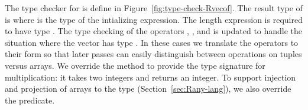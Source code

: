 \documentclass[11pt]{book}
\begin{document}
The type checker for \LangArray{} is define in
Figure~\ref{fig:type-check-Rvecof}. The result type of
 is  where  is the type
of the intializing expression.  The length expression is required to
have type . The type checking of the operators
, , and   is
updated to handle the situation where the vector has type
. In these cases we translate the operators to their
 form so that later passes can easily distinguish
between operations on tuples versus arrays. We override the
 method to provide the type signature for
multiplication: it takes two integers and returns an integer.  To
support injection and projection of arrays to the  type
(Section~\ref{sec:Rany-lang}), we also override the 
predicate.
\end{document}
